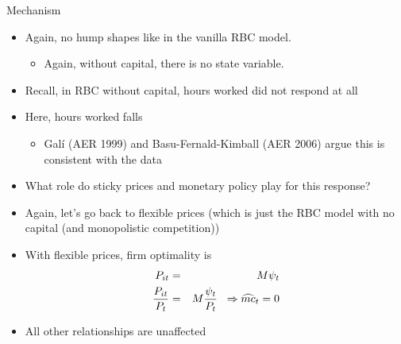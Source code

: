 \documentclass[9pt,xcolor={dvipsnames}]{beamer}
\newcommand{\bit}{\begin{itemize}}
\newcommand{\eit}{\end{itemize}}
\begin{document}
\begin{frame}{Mechanism}

\bit
\setlength\itemsep{1em}
\item Again, no hump shapes like in the vanilla RBC model. 
\bit
	\item Again, without capital, there is no state variable.
\eit

\item Recall, in RBC without capital, hours worked did not respond at all

\item Here, hours worked falls
\bit
	\item Gal\'{i} (AER 1999) and Basu-Fernald-Kimball (AER 2006) argue this is consistent with the data
\eit

\item What role do sticky prices and monetary policy play for this response?

\item Again, let's go back to flexible prices (which is just the RBC model with no capital (and monopolistic competition))

\item With flexible prices, firm optimality is
\begin{eqnarray}
P_{it} &=& M \psi_t \nonumber \\
\frac{P_{it}}{P_t} &=& M \frac{\psi_t}{P_t} \hspace{2mm} \Rightarrow \widehat{mc}_t = 0 \nonumber
\end{eqnarray}

\item All other relationships are unaffected
\eit

\end{frame}
\end{document}
